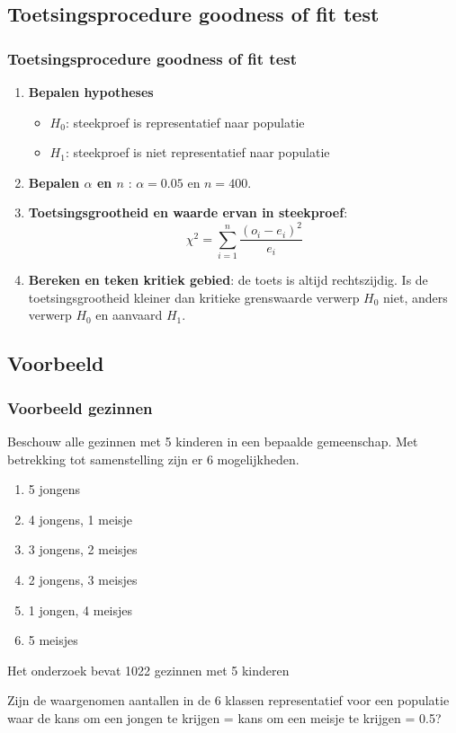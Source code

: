 \documentclass{beamer}
\begin{document}
\subsection{Toetsingsprocedure goodness of fit test}

\begin{frame}
  \frametitle{Toetsingsprocedure goodness of fit test}
  \begin{enumerate}
  \item \textbf{Bepalen hypotheses}
    \begin{itemize}
      \item $H_{0}$: steekproef is representatief naar populatie
      \item $H_{1}$: steekproef is niet representatief naar populatie
    \end{itemize}
  \item \textbf{Bepalen $\alpha$ en $n$} : $\alpha = 0.05$ en $n = 400$.
  \item \textbf{Toetsingsgrootheid en waarde ervan in steekproef}:
  \[ \chi^{2} = \sum_{i=1}^{n} \frac{(o_{i} - e_{i})^{2}}{e_{i}} \]
  \item \textbf{Bereken en teken kritiek gebied}: de toets is altijd rechtszijdig. Is de toetsingsgrootheid kleiner dan kritieke grenswaarde verwerp $H_{0}$ niet, anders verwerp $H_{0}$ en aanvaard $H_{1}$.
\end{enumerate}
\end{frame}

\subsection{Voorbeeld}

\begin{frame}
  \frametitle{Voorbeeld gezinnen}
  Beschouw alle gezinnen met 5 kinderen in een bepaalde gemeenschap.
  \pause
  Met betrekking tot samenstelling zijn er 6 mogelijkheden.
\begin{enumerate}
  \item 5 jongens
  \item 4 jongens, 1 meisje
  \item 3 jongens, 2 meisjes
  \item 2 jongens, 3 meisjes
  \item 1 jongen, 4 meisjes
  \item 5 meisjes
\end{enumerate}
Het onderzoek bevat 1022 gezinnen met 5 kinderen
\begin{center}
Zijn de waargenomen aantallen in de 6 klassen representatief voor een populatie waar de kans om een jongen te krijgen = kans om een meisje te krijgen = 0.5?
\end{center}
\end{frame}
\end{document}

